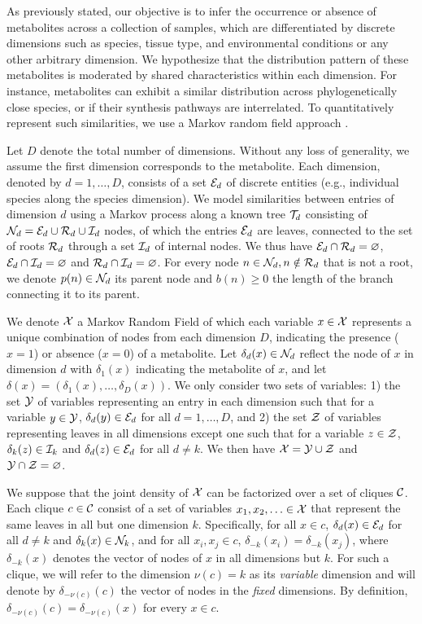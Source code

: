 \documentclass[
11pt, %
english, %
singlespacing, %
headsepline, %
chapterinoneline, %
]{MastersDoctoralThesis} %
\def\E{\mathbb{E}}
\def\Ccal{{\cal C}}
\def\E{{\cal E}}
\def\I{{\cal I}}
\def\N{{\cal N}}
\def\R{{\cal R}}
\def\T{{\cal T}}
\def\X{{\cal X}}
\def\Y{{\cal Y}}
\def\Z{{\cal Z}}
\begin{document}
As previously stated, our objective is to infer the occurrence or absence of metabolites across a collection of samples, which are differentiated by discrete dimensions such as species, tissue type, and environmental conditions or any other arbitrary dimension. We hypothesize that the distribution pattern of these metabolites is moderated by shared characteristics within each dimension. For instance, metabolites can exhibit a similar distribution across phylogenetically close species, or if their synthesis pathways are interrelated. To quantitatively represent such similarities, we use a Markov random field approach \cite{sherringtonSolvableModelSpinGlass1975, kindermannMarkovRandomFields1980}.

Let $D$ denote the total number of dimensions. Without any loss of generality, we assume the first dimension corresponds to the metabolite. Each dimension, denoted by $d=1, \ldots, D$, consists of a set $\E_d$ of discrete entities (e.g., individual species along the species dimension). We model similarities between entries of dimension $d$ using a Markov process along a known tree $\T_d$ consisting of $\N_d = \E_d \cup \R_d \cup \I_d$ nodes, of which the entries $\E_d$ are leaves, connected to the set of roots $\R_d$ through a set $\I_d$ of internal nodes. We thus have $\E_d \cap \R_d = \varnothing$, $\E_d \cap \I_d = \varnothing$ and $\R_d \cap \I_d = \varnothing$. For every node $n \in \N_d, n \notin \R_d$ that is not a root, we denote $p(n) \in \N_d$ its parent node and $b(n) \geq 0$ the length of the branch connecting it to its parent.

We denote $\X$ a Markov Random Field of which each variable $x \in \X$ represents a unique combination of nodes from each dimension $D$, indicating the presence ($x=1$) or absence ($x=0$) of a metabolite. Let $\delta_d(x) \in \N_d$ reflect the node of $x$ in dimension $d$ with $\delta_1(x)$ indicating the metabolite of $x$, and let $\delta(x)=(\delta_1(x), \ldots, \delta_D(x))$. We only consider two sets of variables: 1) the set $\Y$ of variables representing an entry in each dimension such that for a variable $y\in\Y$, $\delta_d(y) \in \E_d$ for all $d=1, \ldots, D$, and 2) the set $\Z$ of variables representing leaves in all dimensions except one such that for a variable $z \in \Z$, $\delta_k(z) \in \I_k$ and $\delta_d(z) \in \E_d$ for all $d \neq k$. We then have $\X = \Y \cup \Z$ and $\Y \cap \Z = \varnothing$.

We suppose that the joint density of $\X$ can be factorized over a set of cliques $\Ccal$. Each clique $c \in \Ccal$ consist of a set of variables $x_1, x_2, \ldots \in \X$ that represent the same leaves in all but one dimension $k$. Specifically, for all $x \in c$, $\delta_d(x) \in \E_d$ for all $d \neq k$ and $\delta_k(x) \in \N_k$, and for all $x_i, x_j \in c$, $\delta_{-k}(x_i) = \delta_{-k}(x_j)$, where $\delta_{-k}(x)$ denotes the vector of nodes of $x$ in all dimensions but $k$. For such a clique, we will refer to the dimension $\nu(c) = k$ as its \emph{variable} dimension and will denote by $\delta_{-\nu(c)}(c)$ the vector of nodes in the \emph{fixed} dimensions. By definition, $\delta_{-\nu(c)}(c)=\delta_{-\nu(c)}(x)$ for every $x \in c$.
\end{document}
